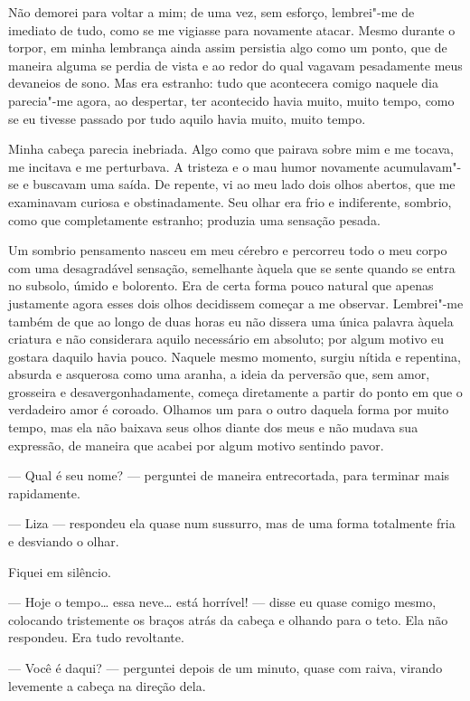 Não demorei para voltar a mim; de uma vez, sem esforço, lembrei"-me de
imediato de tudo, como se me vigiasse para novamente atacar. Mesmo
durante o torpor, em minha lembrança ainda assim persistia algo como um
ponto, que de maneira alguma se perdia de vista e ao redor do qual
vagavam pesadamente meus devaneios de sono. Mas era estranho: tudo que
acontecera comigo naquele dia parecia"-me agora, ao despertar, ter
acontecido havia muito, muito tempo, como se eu tivesse passado por
tudo aquilo havia muito, muito tempo.

Minha cabeça parecia inebriada. Algo como que pairava sobre mim e me
tocava, me incitava e me perturbava. A tristeza e o mau humor novamente
acumulavam"-se e buscavam uma saída. De repente, vi ao meu lado dois
olhos abertos, que me examinavam curiosa e obstinadamente. Seu olhar
era frio e indiferente, sombrio, como que completamente estranho;
produzia uma sensação pesada.

Um sombrio pensamento nasceu em meu cérebro e percorreu todo o meu corpo
com uma desagradável sensação, semelhante àquela que se sente quando se
entra no subsolo, úmido e bolorento. Era de certa forma pouco natural
que apenas justamente agora esses dois olhos decidissem começar a me
observar. Lembrei"-me também de que ao longo de duas horas eu não
dissera uma única palavra àquela criatura e não considerara aquilo
necessário em absoluto; por algum motivo eu gostara daquilo havia
pouco. Naquele mesmo momento, surgiu nítida e repentina, absurda e
asquerosa como uma aranha, a ideia da perversão que, sem amor,
grosseira e desavergonhadamente, começa diretamente a partir do ponto
em que o verdadeiro amor é coroado. Olhamos um para o outro daquela
forma por muito tempo, mas ela não baixava seus olhos diante dos meus e
não mudava sua expressão, de maneira que acabei por algum motivo
sentindo pavor.

--- Qual é seu nome? --- perguntei de maneira entrecortada, para terminar
mais rapidamente.

--- Liza --- respondeu ela quase num sussurro, mas de uma forma totalmente
fria e desviando o olhar.

Fiquei em silêncio.

--- Hoje o tempo\ldots{} essa neve\ldots{} está horrível! --- disse eu quase comigo
mesmo, colocando tristemente os braços atrás da cabeça e olhando para o
teto. Ela não respondeu. Era tudo revoltante.

--- Você é daqui? --- perguntei depois de um minuto, quase com raiva,
virando levemente a cabeça na direção dela.

